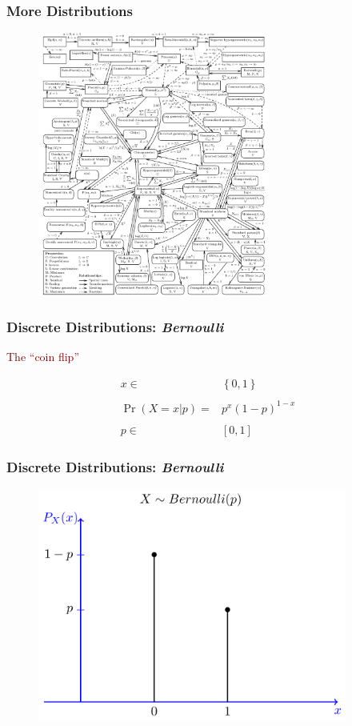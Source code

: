 \documentclass[xcolor={dvipsnames}]{beamer}
\begin{document}
\frame
{
 \frametitle{More Distributions}

\vspace{-.5em}
\begin{figure}[h!]
   \centering
\includegraphics[width=3in]{stuff/connections.png}  
\end{figure}  
}


\frame
{
 \frametitle{Discrete Distributions: \emph{Bernoulli}}
 
 \LARGE
\textcolor{Maroon}{The ``coin flip''}
 
 \huge 
 
\begin{align*}
x \in {} & \left\{0,1\right\} \\\\
\Pr(X=x | p) ={} & p^x(1-p)^{1-x}\\\\
p \in {} & \left[0,1\right]
\end{align*}
}

\frame
{
 \frametitle{Discrete Distributions: \emph{Bernoulli}}

\begin{figure}
\centering
\includegraphics[width=4in]{stuff/bernoulli.png} 
\end{figure}
}
\end{document}
